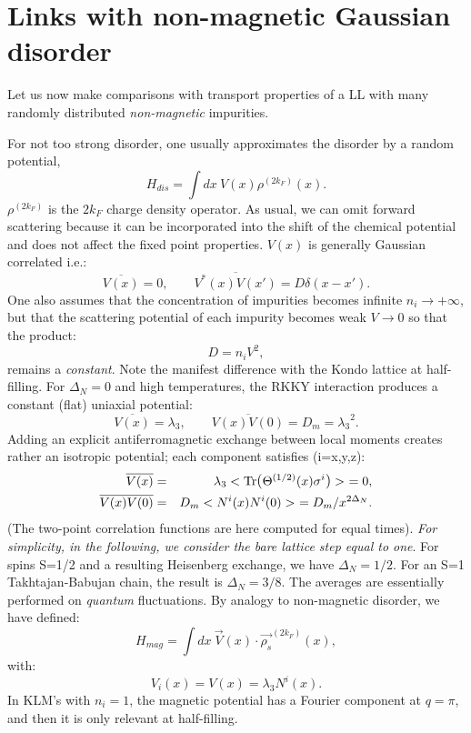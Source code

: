 \section{Links with non-magnetic Gaussian disorder}

Let us now make comparisons with transport properties of a LL with many
randomly distributed {\it non-magnetic} impurities. 

For not too strong disorder, one usually approximates
the disorder by a random potential,
\begin{equation}
H_{dis}=\int dx\ V(x)\rho^{(2k_F)}(x).
\end{equation}
$\rho^{(2k_F)}$ is the $2k_F$ charge density operator.
As usual, we can omit forward scattering because it can be incorporated
into the shift of the chemical potential and does not affect the fixed point
properties. $V(x)$ is generally Gaussian correlated i.e.:
\begin{equation}
\overline{V(x)}=0,\qquad \overline{V^*(x)V(x')}=D\delta(x-x').
\end{equation}
One also assumes that the concentration of impurities becomes
infinite $n_i\rightarrow +\infty$, but that the scattering potential of
each impurity becomes weak $V\rightarrow 0$ so that the product:
\begin{equation}
D=n_iV^2,
\end{equation}
remains a {\it constant}. Note the manifest
difference with the Kondo lattice at half-filling.
For $\Delta_N=0$ and high temperatures, 
the RKKY interaction produces a constant (flat)
uniaxial potential:
\begin{equation}
\overline{V(x)}=\lambda_3,\qquad \overline{V(x)V(0)}=D_m={\lambda_3}^2.
\end{equation}
Adding an explicit antiferromagnetic exchange between local moments creates
rather an isotropic potential; each component satisfies (i=x,y,z):
\begin{eqnarray}
\overline{V(x)}&=&\lambda_3<\hbox{Tr}\hbox{\large(}\Theta^{(1/2)}(x){\sigma}^i
\hbox{\large)}>\ =0,\\ 
\nonumber
\overline{V(x)V(0)}&=&D_m<N^i(x)N^i(0)>\ =D_m/x^{2\Delta_N}.
\end{eqnarray}
(The two-point correlation functions are here computed for equal times).
{\it For simplicity, in the following, we consider the bare
lattice step equal to
one}.
For spins S=1/2 and a resulting Heisenberg exchange, we have $\Delta_N=1/2$.
For an S=1 Takhtajan-Babujan chain, the result is $\Delta_N=3/8$. The
averages are essentially performed on {\it quantum} fluctuations. By analogy 
to non-magnetic disorder, we have defined:
\begin{equation}
H_{mag}=\int dx\ \vec{V}(x)\cdot\vec{\rho_s}^{(2k_F)}(x),
\end{equation}
with:
\begin{equation}
V_i(x)=V(x)=\lambda_3 N^i(x).
\end{equation}
In KLM's with $n_i=1$, the magnetic potential has a 
Fourier component at $q=\pi$, and then it is only relevant at half-filling.

